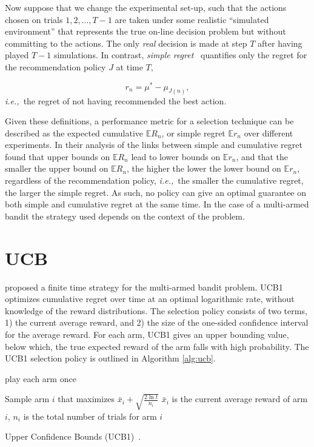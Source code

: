 \documentclass{kecsmstr}
\newcommand{\bE}{\mathbb{E}}
\newcommand{\ie}{{\it i.e.,}~}
\begin{document}
Now suppose that we change the experimental set-up, such that the actions chosen on trials $1, 2, \ldots, T-1$ are taken under some realistic ``simulated environment'' that represents the true on-line decision problem but without committing to the actions. The only \emph{real} decision is made at step $T$ after having played $T-1$ simulations. In contrast, \emph{simple regret}~ quantifies only the regret for the recommendation policy $J$ at time $T$,

\begin{equation}
r_n = \mu^* - \mu_{J(n)},
\end{equation}
\ie the regret of not having recommended the best action.

Given these definitions, a performance metric for a selection technique can be described as the expected cumulative $\bE R_n$, or simple regret $\bE r_n$ over different experiments. In their analysis of the links between simple and cumulative regret~ found that upper bounds on $\bE R_n$ lead to lower bounds on $\bE r_n$, and that the smaller the upper bound on $\bE R_n$, the higher the lower the lower bound on $\bE r_n$, regardless of the recommendation policy, \ie the smaller the cumulative regret, the larger the simple regret. As such, no policy can give an optimal guarantee on both simple and cumulative regret at the same time. In the case of a multi-armed bandit the strategy used depends on the context of the problem.

\section{UCB}
\label{sec:ucb}

 proposed a finite time strategy for the multi-armed bandit problem. UCB1 optimizes cumulative regret over time at an optimal logarithmic rate, without knowledge of the reward distributions. The selection policy consists of two terms, 1) the current average reward, and 2) the size of the one-sided confidence interval for the average reward. For each arm, UCB1 gives an upper bounding value, below which, the true expected reward of the arm falls with high probability. The UCB1 selection policy is outlined in Algorithm \ref{alg:ucb}.

\IncMargin{1em}
\begin{algorithm2e}[ht]
	\Indm
	\vspace{0.2cm}
	\Indp

	play each arm once 																				\;

	 {
		Sample arm $i$ that maximizes $\bar{x}_i + \displaystyle\sqrt{\frac{2\ln{t}}{n_i}}$ \newline
		$\bar{x}_i$ is the current average reward of arm $i$, $n_i$ is the total number of trials for arm $i$ \;
	}

  \caption[Upper Confidence Bounds (UCB1)]{Upper Confidence Bounds (UCB1)~\protect{}. \label{alg:ucb}}
\end{algorithm2e}
\DecMargin{1em}
\end{document}

